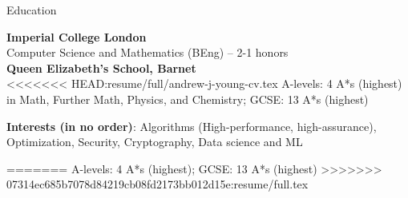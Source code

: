 \documentclass[10pt]{resume} %
\begin{document}

\begin{rSection}{Education}

{\bf Imperial College London} \hfill \\
Computer Science and Mathematics (BEng) -- 2-1 honors \\

{\bf Queen Elizabeth's School, Barnet} \\
<<<<<<< HEAD:resume/full/andrew-j-young-cv.tex
A-levels: 4 A*s (highest) in Math, Further Math, Physics, and Chemistry;
GCSE: 13 A*s (highest)


\textbf{Interests (in no order)}:
  Algorithms (High-performance, high-assurance),
  Optimization,
  Security,
  Cryptography,
  Data science and ML

=======
A-levels: 4 A*s (highest); GCSE: 13 A*s (highest)
>>>>>>> 07314ec685b7078d84219cb08fd2173bb012d15e:resume/full.tex

\end{rSection}

\end{document}

